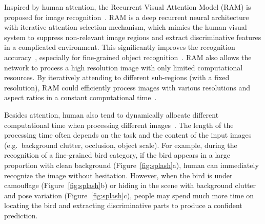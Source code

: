 \documentclass[10pt,twocolumn,letterpaper]{article}
\begin{document}
Inspired by human attention, the Recurrent Visual Attention Model (RAM) is proposed for image recognition~\cite{mnih2014recurrent}.
RAM is a deep recurrent neural architecture with iterative attention selection mechanism, which mimics the human visual system to suppress non-relevant image regions and extract discriminative features in a complicated environment.
This significantly improves the recognition accuracy~\cite{ba2014multiple}, especially for fine-grained object recognition~\cite{sermanet2014attention, liu2016localizing}.
RAM also allows the network to process a high resolution image with only limited computational resources.
By iteratively attending to different sub-regions (with a fixed resolution), RAM could efficiently process images with various resolutions and aspect ratios in a constant computational time~\cite{mnih2014recurrent, ba2014multiple}.

Besides attention, human also tend to dynamically allocate different computational time when processing different images~\cite{cichy2014resolving, deco2004neurodynamical}.
The length of the processing time often depends on the task and the content of the input images (e.g.\ background clutter, occlusion, object scale).
For example, during the recognition of a fine-grained bird category, if the bird appears in a large proportion with clean background (Figure~\ref{fig:splash}a), human can immediately recognize the image without hesitation.
However, when the bird is under camouflage (Figure~\ref{fig:splash}b) or hiding in the scene with background clutter and pose variation (Figure~\ref{fig:splash}c), people may spend much more time on locating the bird and extracting discriminative parts to produce a confident prediction.

\end{document}
